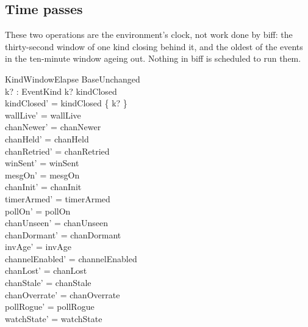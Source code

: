 \documentclass[a4paper,10pt,fleqn]{article}
\begin{document}
\subsection{Time passes}

These two operations are the environment's clock, not work done by biff:
the thirty-second window of one kind closing behind it, and the oldest of
the events in the ten-minute window ageing out.  Nothing in biff is
scheduled to run them.

\begin{schema}{KindWindowElapse}
  BaseUnchanged \\
  k? : EventKind
  \where
  k? \in kindClosed \\
  kindClosed' = kindClosed \setminus \{ k? \} \\
  wallLive' = wallLive \\
  chanNewer' = chanNewer \\
  chanHeld' = chanHeld \\
  chanRetried' = chanRetried \\
  winSent' = winSent \\
  mesgOn' = mesgOn \\
  chanInit' = chanInit \\
  timerArmed' = timerArmed \\
  pollOn' = pollOn \\
  chanUnseen' = chanUnseen \\
  chanDormant' = chanDormant \\
  invAge' = invAge \\
  channelEnabled' = channelEnabled \\
  chanLost' = chanLost \\
  chanStale' = chanStale \\
  chanOverrate' = chanOverrate \\
  pollRogue' = pollRogue \\
  watchState' = watchState
\end{schema}
\end{document}
